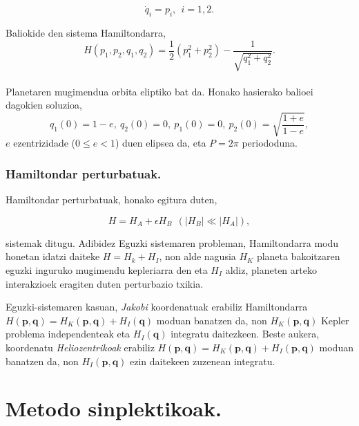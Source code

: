 \begin{equation}
\dot{q}_i=p_i, \ \ i=1,2.
\end{equation}

Baliokide den sistema Hamiltondarra,
\begin{equation}
H(p_1,p_2,q_1,q_2)=\frac{1}{2}(p_1^2+p_2^2)-\frac{1}{\sqrt{q_1^2+q_2^2}}.
\end{equation}

\paragraph*{} Planetaren mugimendua orbita eliptiko bat da. Honako hasierako balioei dagokien soluzioa,
\begin{equation*}
q_1(0)=1-e, \ q_2(0)=0, \ p_1(0)=0, \ p_2(0)=\sqrt{ \frac{1+e}{1-e}}, 
\end{equation*}
$e$ ezentrizidade ($0\le e < 1$) duen elipsea da, eta $P=2\pi$ periododuna. 
 
\subsubsection*{Hamiltondar perturbatuak.}

Hamiltondar perturbatuak, honako egitura duten,

\begin{equation*}
H=H_A+\epsilon H_B \ \ (|H_B|\ll |H_A|),
\end{equation*}

sistemak ditugu. Adibidez Eguzki sistemaren probleman, Hamiltondarra modu honetan idatzi daiteke $H=H_k+H_I$, non alde nagusia $H_K$ planeta bakoitzaren eguzki inguruko mugimendu kepleriarra den eta $H_I$ aldiz, planeten arteko interakzioek eragiten duten perturbazio txikia.   

Eguzki-sistemaren kasuan, \emph{Jakobi} koordenatuak erabiliz Hamiltondarra $H(\mathbf{p},\mathbf{q})=H_K(\mathbf{p},\mathbf{q})+H_I(\mathbf{q})$ moduan banatzen da, non $H_K(\mathbf{p},\mathbf{q})$ Kepler problema independenteak eta $H_I(\mathbf{q})$ integratu daitezkeen. Beste aukera, koordenatu \emph{Heliozentrikoak} erabiliz $H(\mathbf{p},\mathbf{q})=H_K(\mathbf{p},\mathbf{q})+H_I(\mathbf{p},\mathbf{q})$ moduan banatzen da, non $H_I(\mathbf{p},\mathbf{q})$ ezin daitekeen zuzenean integratu.

\section{Metodo sinplektikoak.}

